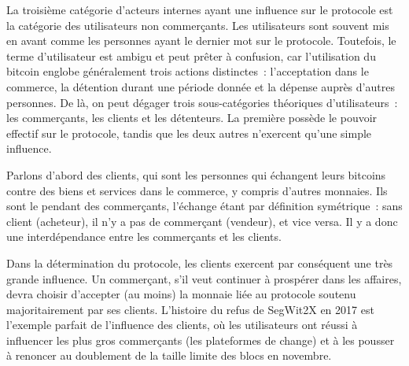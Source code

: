 La troisième catégorie d'acteurs internes ayant une influence sur le protocole est la catégorie des utilisateurs non commerçants. Les utilisateurs sont souvent mis en avant comme les personnes ayant le dernier mot sur le protocole. Toutefois, le terme d'utilisateur est ambigu et peut prêter à confusion, car l'utilisation du bitcoin englobe généralement trois actions distinctes~: l'acceptation dans le commerce, la détention durant une période donnée et la dépense auprès d'autres personnes. De là, on peut dégager trois sous-catégories théoriques d'utilisateurs~: les commerçants, les clients et les détenteurs. La première possède le pouvoir effectif sur le protocole, tandis que les deux autres n'exercent qu'une simple influence.


Parlons d'abord des clients, qui sont les personnes qui échangent leurs bitcoins contre des biens et services dans le commerce, y compris d'autres monnaies. Ils sont le pendant des commerçants, l'échange étant par définition symétrique~: sans client (acheteur), il n'y a pas de commerçant (vendeur), et vice versa. Il y a donc une interdépendance entre les commerçants et les clients. %

Dans la détermination du protocole, les clients exercent par conséquent une très grande influence. Un commerçant, s'il veut continuer à prospérer dans les affaires, devra choisir d'accepter (au moins) la monnaie liée au protocole soutenu majoritairement par ses clients. L'histoire du refus de SegWit2X en 2017 est l'exemple parfait de l'influence des clients, où les utilisateurs ont réussi à influencer les plus gros commerçants (les plateformes de change) et à les pousser à renoncer au doublement de la taille limite des blocs en novembre.

